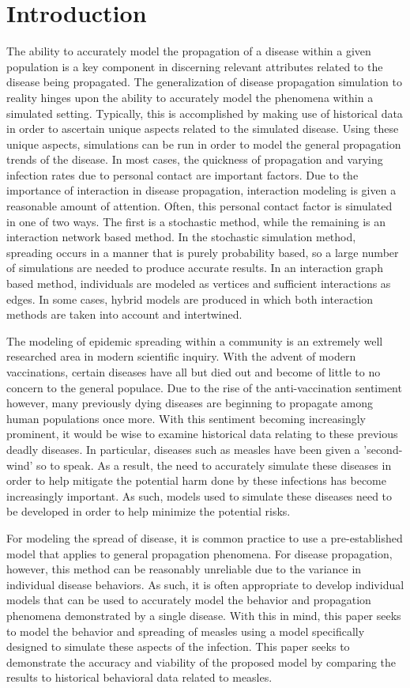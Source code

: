 \documentclass[conference]{IEEEtran}
\begin{document}
\section{Introduction} %
The ability to accurately model the propagation of a disease within a given population is a key component in discerning relevant attributes related to the disease being propagated. The generalization of disease propagation simulation to reality hinges upon the ability to accurately model the phenomena within a simulated setting. Typically, this is accomplished by making use of historical data in order to ascertain unique aspects related to the simulated disease. Using these unique aspects, simulations can be run in order to model the general propagation trends of the disease. In most cases, the quickness of propagation and varying infection rates due to personal contact are important factors. Due to the importance of interaction in disease propagation, interaction modeling is given a reasonable amount of attention. Often, this personal contact factor is simulated in one of two ways. The first is a stochastic method, while the remaining is an interaction network based method. In the stochastic simulation method, spreading occurs in a manner that is purely probability based, so a large number of simulations are needed to produce accurate results. In an interaction graph based method, individuals are modeled as vertices and sufficient interactions as edges. In some cases, hybrid models are produced in which both interaction methods are taken into account and intertwined.\par
The modeling of epidemic spreading within a community is an extremely well researched area in modern scientific inquiry. With the advent of modern vaccinations, certain diseases have all but died out and become of little to no concern to the general populace. Due to the rise of the anti-vaccination sentiment however, many previously dying diseases are beginning to propagate among human populations once more. With this sentiment becoming increasingly prominent, it would be wise to examine historical data relating to these previous deadly diseases. In particular, diseases such as measles have been given a 'second-wind' so to speak. As a result, the need to accurately simulate these diseases in order to help mitigate the potential harm done by these infections has become increasingly important. As such, models used to simulate these diseases need to be developed in order to help minimize the potential risks.\par
For modeling the spread of disease, it is common practice to use a pre-established model that applies to general propagation phenomena. For disease propagation, however, this method can be reasonably unreliable due to the variance in individual disease behaviors. As such, it is often appropriate to develop individual models that can be used to accurately model the behavior and propagation phenomena demonstrated by a single disease. With this in mind, this paper seeks to model the behavior and spreading of measles using a model specifically designed to simulate these aspects of the infection. This paper seeks to demonstrate the accuracy and viability of the proposed model by comparing the results to historical behavioral data related to measles. 
\end{document}
